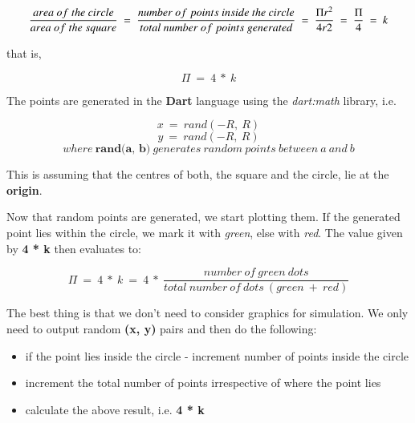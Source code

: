 \documentclass{resonance}
\begin{document}
	$$\frac{area\ of\ the\ circle}{area\ of\ the\ square}\ =\ \frac{number\ of\ points\ inside\ the\ circle}{total\ number\ of\ points\ generated}\ =\ \frac{\Pi r\textsuperscript{2}}{4r2}\ =\ \frac{\Pi}{4}\ =\ k$$
	
	that is,
	
	
	$$\Pi\ =\ 4\ *\ k$$
	
	The points are generated in the \textbf{Dart} language using the \textit{dart:math} library, i.e.
	
	$$x\ =\ rand(-R,\ R)$$
	$$y\ =\ rand(-R,\ R)$$
	$$where\ \textbf{rand(a,\ b)}\ generates\ random\ points\ between\ a\ and\ b$$
	
	This is assuming that the centres of both, the square and the circle, lie at the \textbf{origin}.
	
	Now that random points are generated, we start plotting them. If the generated point lies within the circle, we mark it with \textit{green}, else with \textit{red}. The value given by \textbf{4 * k} then evaluates to:
	
	$$\Pi\ =\ 4\ *\ k\ =\ 4\ *\ \frac{number\ of\ green\ dots}{total\ number\ of\ dots\ (green\ +\ red)}$$
	
	The best thing is that we don’t need to consider graphics for simulation. We only need to output random \textbf{(x, y)} pairs and then do the following:
	
	\begin{itemize}
		\item if the point lies inside the circle - increment number of points inside the circle
		\item increment the total number of points irrespective of where the point lies
		\item calculate the above result, i.e. \textbf{4 * k}
	\end{itemize}
	
\end{document}
